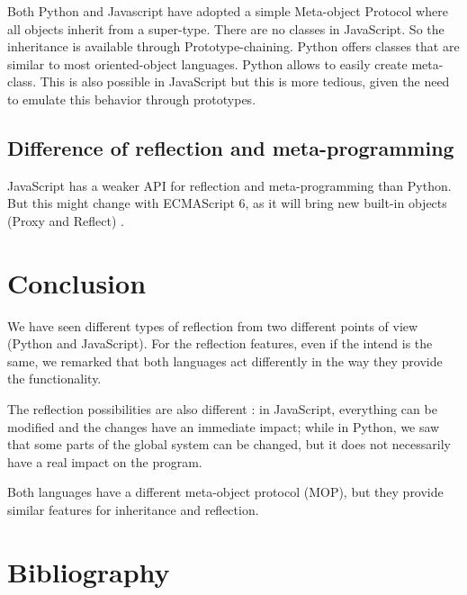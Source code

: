 \documentclass[a4paper,10pt]{article}
\begin{document}
Both Python and Javascript have adopted a simple Meta-object Protocol where all objects inherit from a super-type. There are no classes in JavaScript. So the inheritance is available through Prototype-chaining. Python offers classes that are similar to most oriented-object languages. Python allows to easily create meta-class. This is also possible in JavaScript but this is more tedious, given the need to emulate this behavior through prototypes.


\subsection{Difference of reflection and meta-programming}

JavaScript has a weaker API for reflection and meta-programming than Python. But this might change with ECMAScript 6, as it will bring new built-in objects (Proxy and Reflect) \cite{js:meta}.


\section{Conclusion}

We have seen different types of reflection from two different points of view (Python and JavaScript).
For the reflection features, even if the intend is the same, we remarked that both languages act differently in the way they provide the functionality.

The reflection possibilities are also different : in JavaScript, everything can be modified and the changes have an immediate impact; while in Python, we saw that some parts of the global system can be changed, but it does not necessarily have a real impact on the program.

Both languages have a different meta-object protocol (MOP), but they provide similar features for inheritance and reflection.

\newpage
\section{Bibliography}



\end{document}
